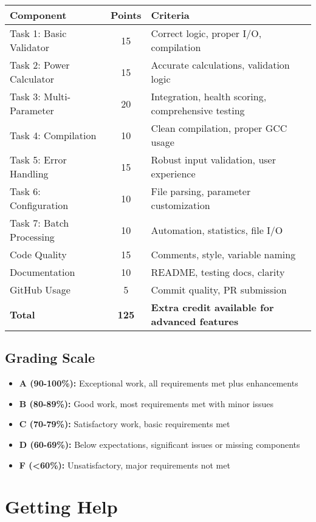 \documentclass[11pt,a4paper]{article}
\begin{document}
\begin{center}
\begin{tabular}{|l|c|l|}
\hline
\textbf{Component} & \textbf{Points} & \textbf{Criteria} \\
\hline
Task 1: Basic Validator & 15 & Correct logic, proper I/O, compilation \\
Task 2: Power Calculator & 15 & Accurate calculations, validation logic \\
Task 3: Multi-Parameter & 20 & Integration, health scoring, comprehensive testing \\
Task 4: Compilation & 10 & Clean compilation, proper GCC usage \\
Task 5: Error Handling & 15 & Robust input validation, user experience \\
Task 6: Configuration & 10 & File parsing, parameter customization \\
Task 7: Batch Processing & 10 & Automation, statistics, file I/O \\
Code Quality & 15 & Comments, style, variable naming \\
Documentation & 10 & README, testing docs, clarity \\
GitHub Usage & 5 & Commit quality, PR submission \\
\hline
\textbf{Total} & \textbf{125} & \textbf{Extra credit available for advanced features} \\
\hline
\end{tabular}
\end{center}

\subsection{Grading Scale}
\begin{itemize}
    \item \textbf{A (90-100\%):} Exceptional work, all requirements met plus enhancements
    \item \textbf{B (80-89\%):} Good work, most requirements met with minor issues
    \item \textbf{C (70-79\%):} Satisfactory work, basic requirements met
    \item \textbf{D (60-69\%):} Below expectations, significant issues or missing components
    \item \textbf{F (<60\%):} Unsatisfactory, major requirements not met
\end{itemize}

\section{Getting Help}
\end{document}
